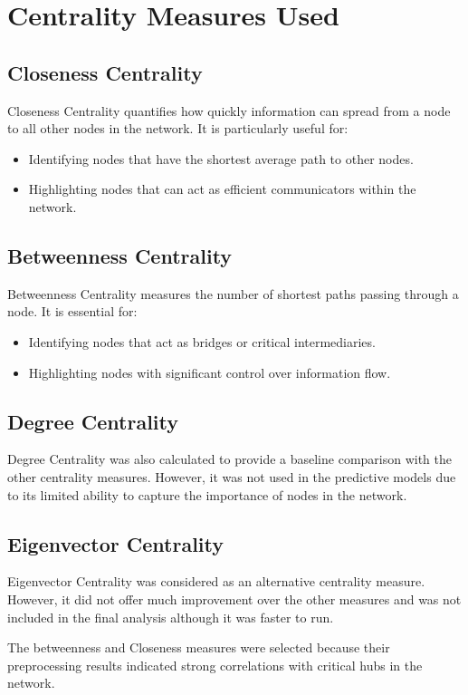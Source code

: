 \documentclass[12pt]{article}
\begin{document}
\section*{Centrality Measures Used}
\subsection*{Closeness Centrality}
Closeness Centrality quantifies how quickly information can spread from a node to all other nodes in the network. It is particularly useful for:
\begin{itemize}
	\item Identifying nodes that have the shortest average path to other nodes.
	\item Highlighting nodes that can act as efficient communicators within the network.
\end{itemize}

\subsection*{Betweenness Centrality}
Betweenness Centrality measures the number of shortest paths passing through a node. It is essential for:
\begin{itemize}
	\item Identifying nodes that act as bridges or critical intermediaries.
	\item Highlighting nodes with significant control over information flow.
\end{itemize}

\subsection*{Degree Centrality}
Degree Centrality was also calculated to provide a baseline comparison with the other centrality measures. However, it was not used in the predictive models due to its limited ability to capture the importance of nodes in the network.

\subsection*{Eigenvector Centrality}
Eigenvector Centrality was considered as an alternative centrality measure. However, it did not offer much improvement over the other measures and was not included in the final analysis although it was faster to run.

The betweenness and Closeness measures were selected because their preprocessing results indicated strong correlations with critical hubs in the network.
\end{document}
